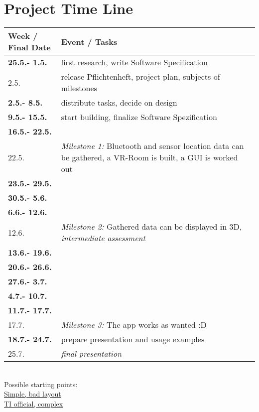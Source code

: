 \section{Project Time Line}


\begin{tabular}{l|p{12cm}}

\textbf{Week / Final Date}  & \textbf{Event / Tasks} \\ \hline

\textbf{25.5.- 1.5.} & first research, write Software Specification \\ 
2.5. & release Pflichtenheft, project plan, subjects of milestones\\ \hline
\textbf{2.5.- 8.5.} & distribute tasks, decide on design\\ 
\textbf{9.5.- 15.5.} & start building, finalize Software Spezification \\ 
\textbf{16.5.- 22.5.} & \\
22.5. & \textit{Milestone 1:} Bluetooth and sensor location data can be gathered, a VR-Room is built, a GUI is worked out\\ \hline
\textbf{23.5.- 29.5.} &  \\
\textbf{30.5.- 5.6.} & \\
\textbf{6.6.- 12.6.} & \\
12.6. & \textit{Milestone 2:} Gathered data can be displayed in 3D, \textit{intermediate assessment} \\ \hline
\textbf{13.6.- 19.6.} & \\
\textbf{20.6.- 26.6.} & \\
\textbf{27.6.- 3.7.} & \\
\textbf{4.7.- 10.7.} & \\
\textbf{11.7.- 17.7.} & \\
17.7. & \textit{Milestone 3:} The app works as wanted :D \\ \hline
\textbf{18.7.- 24.7.} & prepare presentation and usage examples\\
25.7. & \textit{final presentation }

\end{tabular} \\



Possible starting points: \\
\href{https://bitbucket.org/StylingAndroid/bluetoothle/src/1fe191cf34f34f9917b1d0d62c617c607fe3df4d/src/main/java/com/stylingandroid/ble/?at=Part2}{Simple, bad layout} \\
\href{https://git.ti.com/sensortag-20-android/sensortag-20-android/trees/master/sensortag20/BleSensorTag/src/main/java/com/example/ti}{TI official, complex}
